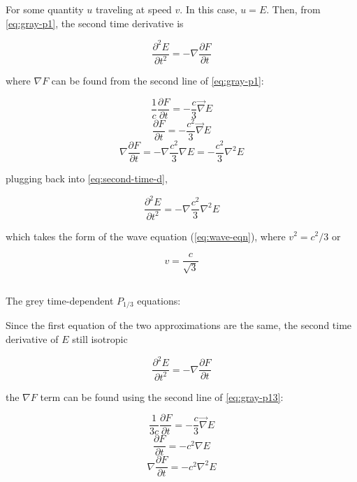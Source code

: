 \documentclass{template}
\begin{document}
For some quantity $u$ traveling at speed $v$. In this case, $u=E$. Then, from \autoref{eq:gray-p1}, the second time derivative is

\begin{equation}\label{eq:second-time-d}
    \frac{\partial^2 E}{\partial t^2} = -\nabla \frac{\partial F}{\partial t}
\end{equation}

where $\nabla F$ can be found from the second line of \autoref{eq:gray-p1}:

\begin{equation}
    \frac{1}{c}\frac{\partial F}{\partial t} = - \frac{c}{3}\vec{\nabla}E
\end{equation}
\begin{equation}
     \frac{\partial F}{\partial t} = - \frac{c^2}{3}\vec{\nabla}E
\end{equation}
\begin{equation}
    \nabla \frac{\partial F}{\partial t} = - \nabla \frac{c^2}{3}\nabla E = - \frac{c^2}{3}\nabla^2 E
\end{equation}

plugging back into \autoref{eq:second-time-d},

\begin{equation}
    \frac{\partial^2 E}{\partial t^2} = -\nabla \frac{c^2}{3}\nabla^2 E
\end{equation}

which takes the form of the wave equation (\autoref{eq:wave-eqn}), where $v^2 = c^2/3$ or

\begin{equation}
    \boxed{v = \frac{c}{\sqrt{3}}}
\end{equation}

\subsection{} The grey time-dependent $P_{1/3}$ equations:

Since the first equation of the two approximations are the same, the second time derivative of $E$ still isotropic

\begin{equation}\label{eq:p13-second-time-d}
    \frac{\partial^2 E}{\partial t^2} = -\nabla \frac{\partial F}{\partial t}
\end{equation}

the $\nabla F$ term can be found using the second line of \autoref{eq:gray-p13}:

\begin{equation}
    \frac{1}{3c}\frac{\partial F}{\partial t} = - \frac{c}{3}\vec{\nabla}E
\end{equation}
\begin{equation}
    \frac{\partial F}{\partial t} = - c^2\nabla E
\end{equation}
\begin{equation}
    \nabla \frac{\partial F}{\partial t} = - c^2\nabla^2 E
\end{equation}
\end{document}
